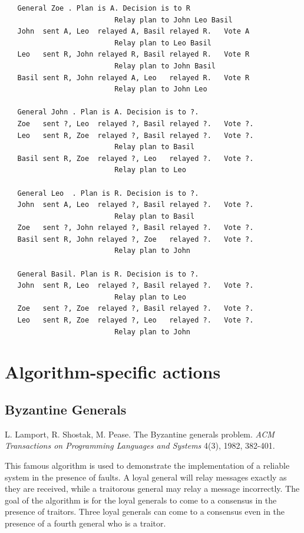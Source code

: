 \documentclass[11pt]{article}
\begin{document}
\begin{verbatim}
   General Zoe . Plan is A. Decision is to R
                          Relay plan to John Leo Basil
   John  sent A, Leo  relayed A, Basil relayed R.   Vote A
                          Relay plan to Leo Basil
   Leo   sent R, John relayed R, Basil relayed R.   Vote R
                          Relay plan to John Basil
   Basil sent R, John relayed A, Leo   relayed R.   Vote R
                          Relay plan to John Leo

   General John . Plan is A. Decision is to ?.
   Zoe   sent ?, Leo  relayed ?, Basil relayed ?.   Vote ?.
   Leo   sent R, Zoe  relayed ?, Basil relayed ?.   Vote ?.
                          Relay plan to Basil
   Basil sent R, Zoe  relayed ?, Leo   relayed ?.   Vote ?.
                          Relay plan to Leo

   General Leo  . Plan is R. Decision is to ?.
   John  sent A, Leo  relayed ?, Basil relayed ?.   Vote ?.
                          Relay plan to Basil
   Zoe   sent ?, John relayed ?, Basil relayed ?.   Vote ?.
   Basil sent R, John relayed ?, Zoe   relayed ?.   Vote ?.
                          Relay plan to John

   General Basil. Plan is R. Decision is to ?.
   John  sent R, Leo  relayed ?, Basil relayed ?.   Vote ?.
                          Relay plan to Leo
   Zoe   sent ?, Zoe  relayed ?, Basil relayed ?.   Vote ?.
   Leo   sent R, Zoe  relayed ?, Leo   relayed ?.   Vote ?.
                          Relay plan to John
\end{verbatim}

\section{Algorithm-specific actions}

\subsection{Byzantine Generals}
L. Lamport, R. Shostak, M. Pease.
The Byzantine generals problem.
\emph{ACM Transactions on Programming Languages and Systems}
4(3), 1982, 382-401.

This famous algorithm is used to demonstrate the implementation
of a reliable system in the presence of faults. A loyal general
will relay messages exactly as they are received, while a
traitorous general may relay a message incorrectly. The goal of
the algorithm is for the loyal generals to come to a consensus
in the presence of traitors. Three loyal generals can come to a
consensus even in the presence of a fourth general who is a
traitor.
\end{document}
